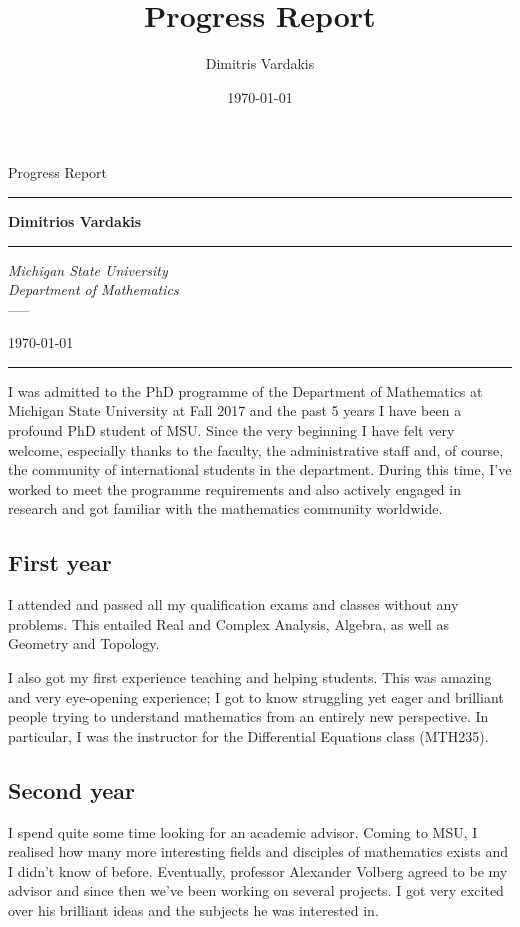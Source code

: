\documentclass[11pt]{amsart} %
\title[]{Progress Report}
\author[D.~Vardakis]{Dimitris Vardakis}
\date{\today}
\begin{document}
\begin{center}
	\setlength{\parindent}{0pt}
	\setlength{\parskip}{4pt}
	\setlength{\baselineskip}{4pt}
	{\huge Progress Report}
	
	
	\rule[2.5pt]{0.8\textwidth}{1pt}
	
	{\Huge \bf Dimitrios Vardakis}
	
	\rule[-2pt]{\textwidth}{3pt} \vspace*{-3pt}
	
	{\Large \textit{Michigan State University\\ [5pt]
		Department of Mathematics}\\
		-----
		
		\today}
	
	\rule{0.61\textwidth}{1pt}
	
	\bigskip
\end{center}

I was admitted to the PhD programme of the Department of Mathematics at Michigan State University at Fall 2017 and the past 5 years I have been a profound PhD student of MSU. Since the very beginning I have felt very welcome, especially thanks to the faculty, the administrative staff and, of course, the community of international students in the department. During this time, I've worked to meet the programme requirements and also actively engaged in research and got familiar with the mathematics community worldwide.


\subsection*{First year} I attended and passed all my qualification exams and classes without any problems. This entailed Real and Complex Analysis, Algebra, as well as Geometry and Topology.

I also got my first experience teaching and helping students. This was amazing and very eye-opening experience; I got to know struggling yet eager and brilliant people trying to understand mathematics from an entirely new perspective. In particular, I was the instructor for the Differential Equations class (MTH235).


\subsection*{Second year} I spend quite some time looking for an academic advisor. Coming to MSU, I realised how many more interesting fields and disciples of mathematics exists and I didn't know of before. Eventually, professor Alexander Volberg agreed to be my advisor and since then we've been working on several projects. I got very excited over his brilliant ideas and the subjects he was interested in.
\end{document}
